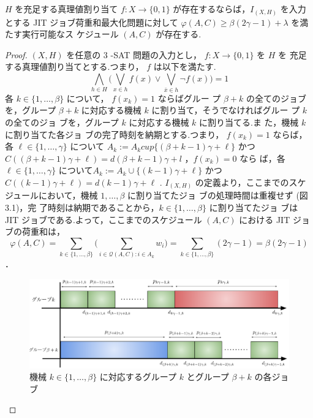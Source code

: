 \documentclass[12pt]{optlab-bachelor}
\begin{document}
\begin{lemma}\label{l_1}
  $H$ を充足する真理値割り当て $f : X \to \{0,1\}$ が存在するならば，$I_{(X,H)}$ を入力とする JIT ジョブ荷重和最大化問題に対して
  $\varphi(A, C) \ge \beta(2\gamma - 1) + \lambda$ を満たす実行可能なス
  ケジュール $(A, C)$ が存在する.
\end{lemma}

\begin{proof}
  $(X,H)$ を任意の 3 -SAT 問題の入力とし， $f : X \to \{0,1\}$ を $H$ を
  充足する真理値割り当てとする.つまり， $f$ は以下を満たす.
  $$\displaystyle \bigwedge_{h \in H} \bigg(\bigvee_{x \in h}f(x) \lor
  \bigvee_{\bar x \in h}\lnot f(x) \bigg) = 1$$
  各 $k \in \{1,\ldots, \beta\}$ について， $f(x_k) = 1$ ならばグルー
  プ $\beta + k$ の全てのジョブを，グループ $\beta + k$ に対応する機械
  $k$ に割り当て，そうでなければグルー
  プ $k$ の全てのジョ ブを，グループ $k$ に対応する機械 $k$ に割り当てる.ま
  た，機械 $k$ に割り当てた各ジョ ブの完了時刻を納期とする.つまり，
  $f(x_k) = 1$ ならば，各 $\ell \in \{1,\ldots,\gamma\}$ について $A_k
  :=A_k cup\{(\beta+k−1)\gamma+\ell\}$ かつ
  $C((\beta+k−1)\gamma+\ell)=d(\beta+k−1)\gamma+l$ ，$f(x_k)=0$ なら
  ば，各 $\ell \in \{1,\ldots,\gamma \}$ について$A_k :=A_k \cup
  \{(k−1)\gamma+\ell \}$ かつ $C((k−1)\gamma+\ell)=d(k−1)\gamma+\ell$
  . $I_{(X,H)}$ の定義より，ここまでのスケジュールにおいて，機械
  $1,\ldots, \beta$ に割り当てたジョ ブの処理時間は重複せず (図 3.1)，完
  了時刻は納期であることから，$k \in \{1,\ldots,\beta\}$ に割り当てたジョ
  ブは JIT ジョブである.よって，ここまでのスケジュール $(A, C)$ における
  JIT ジョブの荷重和は，
  $$\displaystyle \varphi(A,C) = \sum_{k \in
  \{1,\ldots,\beta\}}\bigg(\sum_{i \in \mathcal{Q}(A,C):i \in
  A_k}w_i\bigg) = \sum_{k \in \{1,\ldots,\beta\}}(2\gamma - 1) =
  \beta(2\gamma - 1)$$．

  \begin{figure}[h]
    \centering
    \includegraphics[width = 15cm]{figure/SJIT.pdf}
    \caption{機械 $k \in \{1,\ldots,\beta\}$ に対応するグループ $k$
    とグループ $\beta + k$ の各ジョブ}
  \end{figure}


\end{proof}
\end{document}
